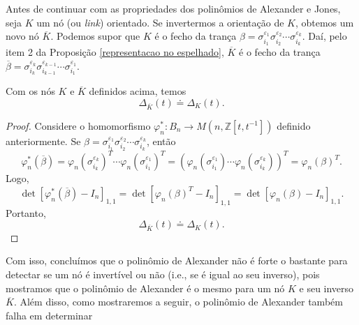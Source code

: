 	\par\vspace{0.3cm} Antes de continuar com as propriedades dos polinômios de Alexander e Jones, 
	seja $K$ um nó (ou \textit{link}) orientado. Se invertermos a orientação de $K$, 
	obtemos um novo nó $\overline{K}$. Podemos supor que $K$ é o fecho da trança
	$\beta = \sigma_{i_1}^{\varepsilon_1}\sigma_{i_2}^{\varepsilon_2}\cdots\sigma_{i_k}^{\varepsilon_k}$. 
	Daí, pelo item 2 da Proposição \ref{representacao no espelhado}, $\overline{K}$ é o fecho 
	da trança $\overline{\beta} =
	\sigma_{i_k}^{\varepsilon_k}\sigma_{i_{k-1}}^{\varepsilon_{k-1}}\cdots\sigma_{i_1}^{\varepsilon_1}$.
	\begin{prop}
	\label{polinomio de Alexander para nos invertidos}
		Com os nós $K$ e $\overline{K}$ definidos acima, temos
		\begin{equation*}
		    \Delta_{\overline{K}}(t) \doteq \Delta_K(t).
		\end{equation*}
	\end{prop}
	\begin{proof}
		Considere o homomorfismo $\varphi_n^\ast: B_n\to M(n, \mathbb{Z}[t,t^{-1}])$ 
		definido anteriormente. 
		Se $\beta=\sigma_{i_1}^{\varepsilon_1}\sigma_{i_2}^{\varepsilon_2}\cdots\sigma_{i_k}^{\varepsilon_k}$, 
		então
		\begin{equation*}
    		\varphi_n^\ast(\overline{\beta}) 
    		= \varphi_n(\sigma_{i_k}^{\varepsilon_k})^T\cdots\varphi_n(\sigma_{i_1}^{\varepsilon_1})^T 
    		= (\varphi_n(\sigma_{i_1}^{\varepsilon_1})\cdots\varphi_n(\sigma_{i_k}^{\varepsilon_k}))^T 
    		= \varphi_n(\beta)^T.
		\end{equation*}
		Logo,
		\begin{equation*}
    		\det[\varphi_n^\ast(\overline{\beta}) - I_n]_{1,1} 
    		= \det[\varphi_n(\beta)^T - I_n]_{1,1} 
    		= \det[\varphi_n(\beta) - I_n]_{1,1}.
		\end{equation*}
		Portanto,
		\begin{equation*}
		    \Delta_{\overline{K}}(t) \doteq \Delta_K(t).
		\end{equation*}
	\end{proof}
	Com isso, concluímos que o polinômio de Alexander não é forte o bastante para 
	detectar se um nó é invertível ou não (i.e., se é igual ao seu inverso), pois 
	mostramos que o polinômio de Alexander é o mesmo para um nó $K$ e seu inverso $\overline{K}$. 
	Além disso, como mostraremos a seguir, o polinômio de Alexander também falha em determinar 
